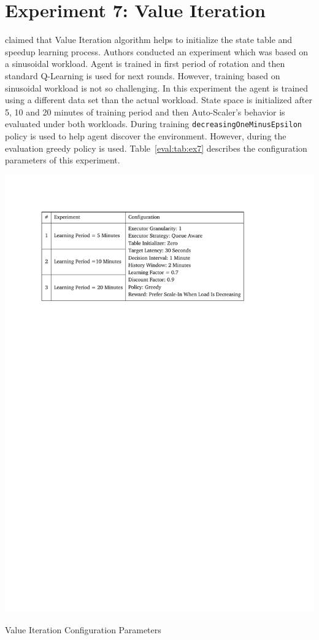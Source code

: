 \section{Experiment 7: Value Iteration}
\textcite{dutreilh:hal-01122123} claimed that Value Iteration algorithm helps to initialize the state table and speedup learning process. Authors conducted an experiment which was based on a sinusoidal workload. Agent is trained in first period of rotation and then standard Q-Learning is used for next rounds. However, training based on sinusoidal workload is not so challenging. In this experiment the agent is trained using a different data set than the actual workload. State space is initialized after 5, 10 and 20 minutes of training period and then Auto-Scaler's behavior is evaluated under both workloads. During training \lstinline|decreasingOneMinusEpsilon| policy is used to help agent discover the environment. However, during the evaluation greedy policy is used. Table~\ref{eval:tab:ex7} describes the configuration parameters of this experiment.
\begin{table}[h]
    \includegraphics[clip,trim=2.4cm 21.18cm 4.65cm 2.5cm]{tables/ex7.pdf}
    \centering
    \caption{Value Iteration Configuration Parameters}
    \label{eval:tab:ex7}
\end{table}

